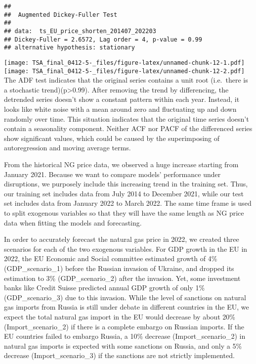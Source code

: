 \documentclass[
]{article}
\begin{document}
\begin{verbatim}
## 
##  Augmented Dickey-Fuller Test
## 
## data:  ts_EU_price_shorten_201407_202203
## Dickey-Fuller = 2.6572, Lag order = 4, p-value = 0.99
## alternative hypothesis: stationary
\end{verbatim}

\texttt{[image: TSA\_final\_0412-5-\_files/figure-latex/unnamed-chunk-12-1.pdf]}
\texttt{[image: TSA\_final\_0412-5-\_files/figure-latex/unnamed-chunk-12-2.pdf]}
The ADF test indicates that the original series contains a unit root
(i.e.~there is a stochastic trend)(p\textgreater0.99). After removing
the trend by differencing, the detrended series doesn't show a constant
pattern within each year. Instead, it looks like white noise with a mean
around zero and fluctuating up and down randomly over time. This
situation indicates that the original time series doesn't contain a
seasonality component. Neither ACF nor PACF of the differenced series
show significant values, which could be caused by the superimposing of
autoregression and moving average terms.

From the historical NG price data, we observed a huge increase starting
from January 2021. Because we want to compare models' performance under
disruptions, we purposely include this increasing trend in the training
set. Thus, our training set includes data from July 2014 to December
2021, while our test set includes data from January 2022 to March 2022.
The same time frame is used to split exogenous variables so that they
will have the same length as NG price data when fitting the models and
forecasting.

In order to accurately forecast the natural gas price in 2022, we
created three scenarios for each of the two exogenous variables. For GDP
growth in the EU in 2022, the EU Economic and Social committee estimated
growth of 4\% (GDP\_scenario\_1) before the Russian invasion of Ukraine,
and dropped its estimation to 3\% (GDP\_scenario\_2) after the invasion.
Yet, some investment banks like Credit Suisse predicted annual GDP
growth of only 1\% (GDP\_scenario\_3) due to this invasion. While the
level of sanctions on natural gas imports from Russia is still under
debate in different countries in the EU, we expect the total natural gas
import in the EU would decrease by about 20\% (Import\_scenario\_2) if
there is a complete embargo on Russian imports. If the EU countries
failed to embargo Russia, a 10\% decrease (Import\_scenario\_2) in
natural gas imports is expected with some sanctions on Russia, and only
a 5\% decrease (Import\_scenario\_3) if the sanctions are not strictly
implemented.
\end{document}
